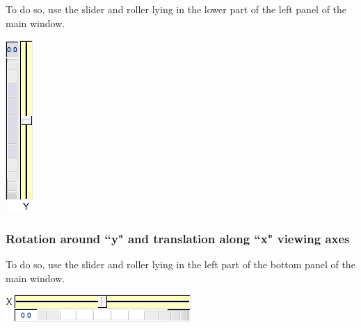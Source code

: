 \begin{minipage}{0.7\textwidth}
To do so, use the slider and roller lying in the lower part of the left panel of the
main window.
\end{minipage}    
\begin{minipage}{0.25\textwidth}\centering
  \includegraphics[scale=0.5]{images/Icons/y_rot.png}
 \end{minipage}   

\subsubsection{Rotation around ``y" and translation along ``x" viewing axes}


\begin{minipage}{0.5\textwidth}
To do so, use the slider and roller lying in the left part of the bottom panel of the
main window.
\end{minipage}    
\begin{minipage}{0.4\textwidth}\centering
  \includegraphics[scale=0.5]{images/Icons/z_rot.png}
 \end{minipage}   

